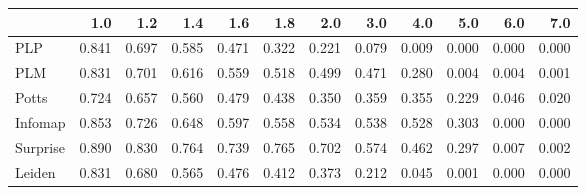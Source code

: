 \begin{tabular}{lrrrrrrrrrrr}
\toprule
{} &   1.0 &   1.2 &   1.4 &   1.6 &   1.8 &   2.0 &   3.0 &   4.0 &   5.0 &   6.0 &   7.0 \\
\midrule
PLP      & 0.841 & 0.697 & 0.585 & 0.471 & 0.322 & 0.221 & 0.079 & 0.009 & 0.000 & 0.000 & 0.000 \\
PLM      & 0.831 & 0.701 & 0.616 & 0.559 & 0.518 & 0.499 & 0.471 & 0.280 & 0.004 & 0.004 & 0.001 \\
Potts    & 0.724 & 0.657 & 0.560 & 0.479 & 0.438 & 0.350 & 0.359 & 0.355 & 0.229 & 0.046 & 0.020 \\
Infomap  & 0.853 & 0.726 & 0.648 & 0.597 & 0.558 & 0.534 & 0.538 & 0.528 & 0.303 & 0.000 & 0.000 \\
Surprise & 0.890 & 0.830 & 0.764 & 0.739 & 0.765 & 0.702 & 0.574 & 0.462 & 0.297 & 0.007 & 0.002 \\
Leiden   & 0.831 & 0.680 & 0.565 & 0.476 & 0.412 & 0.373 & 0.212 & 0.045 & 0.001 & 0.000 & 0.000 \\
\bottomrule
\end{tabular}
